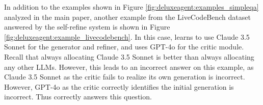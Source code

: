 In addition to the examples shown in Figure \ref{fig:deluxeagent:examples_simpleqa} analyzed in the main paper, another example from the LiveCodeBench dataset answered by the self-refine system is shown in Figure \ref{fig:deluxeagent:example_livecodebench}. In this case, \deluxesystem{} learns to use Claude 3.5 Sonnet for the generator and refiner, and uses GPT-4o for the critic module. Recall that always allocating Claude 3.5 Sonnet is better than always allocating any other LLMs. However, this leads to an incorrect answer on this example, as Claude 3.5 Sonnet as the critic fails to realize its own generation is incorrect. However, GPT-4o as the critic correctly identifies the initial generation is incorrect.  Thus \deluxesystem{} correctly answers this question.  
